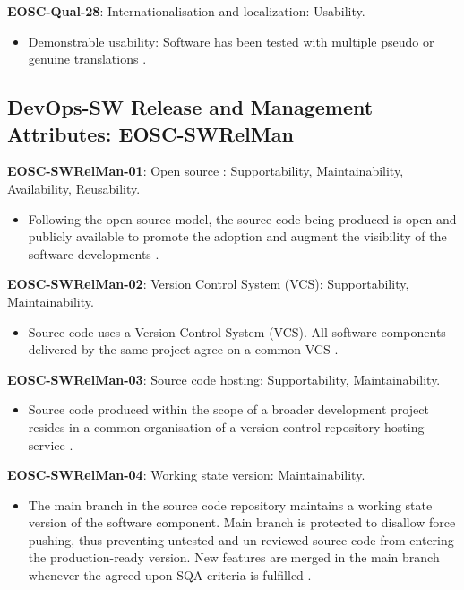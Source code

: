 \textbf{EOSC-Qual-28}: Internationalisation and localization: Usability.

\begin{itemize}
    \item Demonstrable usability: Software has been tested with multiple pseudo or genuine translations \cite{shepherdson_cessda_2019}.
\end{itemize}

\subsection{DevOps-SW Release and Management Attributes: EOSC-SWRelMan}

\textbf{EOSC-SWRelMan-01}: Open source : Supportability, Maintainability, Availability, Reusability.

\begin{itemize}
    \item Following the open-source model, the source code being produced is open and publicly available to promote the adoption and augment the visibility of the software developments \cite{orviz_set_2017,raymond_software_2013}.
\end{itemize}

\textbf{EOSC-SWRelMan-02}: Version Control System (VCS): Supportability, Maintainability.

\begin{itemize}
    \item Source code uses a Version Control System (VCS). All software components delivered by the same project agree on a common VCS \cite{orviz_set_2017}.
\end{itemize}

\textbf{EOSC-SWRelMan-03}: Source code hosting: Supportability, Maintainability.

\begin{itemize}
    \item Source code produced within the scope of a broader development project resides in a common organisation of a version control repository hosting service \cite{orviz_set_2017}.
\end{itemize}

\textbf{EOSC-SWRelMan-04}: Working state version: Maintainability.

\begin{itemize}
    \item The main branch in the source code repository maintains a working state version of the software component. Main branch is protected to disallow force pushing, thus preventing untested and un-reviewed source code from entering the production-ready version. New features are merged in the main branch whenever the agreed upon SQA criteria is fulfilled \cite{orviz_set_2017}.
\end{itemize}

